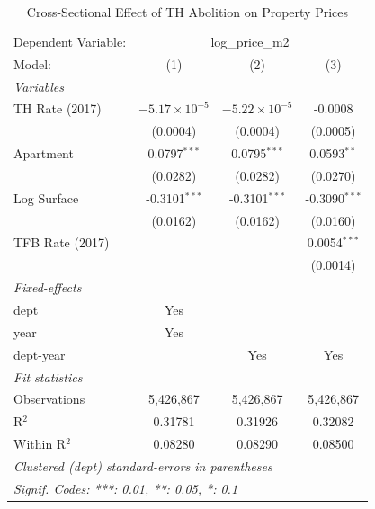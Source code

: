 \begin{table}[htbp]
   \caption{\label{tab:main_results} Cross-Sectional Effect of TH Abolition on Property Prices}
   \centering
   \begin{tabular}{lccc}
      \tabularnewline \midrule \midrule
      Dependent Variable: & \multicolumn{3}{c}{log\_price\_m2}\\
      Model:          & (1)                    & (2)                    & (3)\\  
      \midrule
      \emph{Variables}\\
      TH Rate (2017)  & $-5.17\times 10^{-5}$  & $-5.22\times 10^{-5}$  & -0.0008\\   
                      & (0.0004)               & (0.0004)               & (0.0005)\\   
      Apartment       & 0.0797$^{***}$         & 0.0795$^{***}$         & 0.0593$^{**}$\\   
                      & (0.0282)               & (0.0282)               & (0.0270)\\   
      Log Surface     & -0.3101$^{***}$        & -0.3101$^{***}$        & -0.3090$^{***}$\\   
                      & (0.0162)               & (0.0162)               & (0.0160)\\   
      TFB Rate (2017) &                        &                        & 0.0054$^{***}$\\   
                      &                        &                        & (0.0014)\\   
      \midrule
      \emph{Fixed-effects}\\
      dept            & Yes                    &                        & \\  
      year            & Yes                    &                        & \\  
      dept-year       &                        & Yes                    & Yes\\  
      \midrule
      \emph{Fit statistics}\\
      Observations    & 5,426,867              & 5,426,867              & 5,426,867\\  
      R$^2$           & 0.31781                & 0.31926                & 0.32082\\  
      Within R$^2$    & 0.08280                & 0.08290                & 0.08500\\  
      \midrule \midrule
      \multicolumn{4}{l}{\emph{Clustered (dept) standard-errors in parentheses}}\\
      \multicolumn{4}{l}{\emph{Signif. Codes: ***: 0.01, **: 0.05, *: 0.1}}\\
   \end{tabular}
\end{table}
